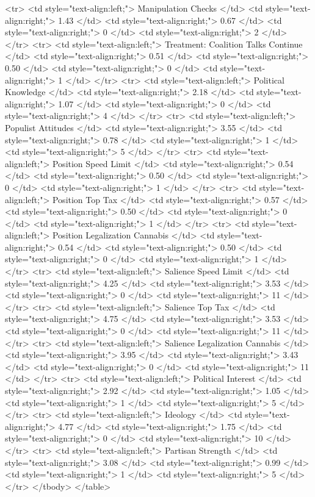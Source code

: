   <tr>
   <td style="text-align:left;"> Manipulation Checks </td>
   <td style="text-align:right;"> 1.43 </td>
   <td style="text-align:right;"> 0.67 </td>
   <td style="text-align:right;"> 0 </td>
   <td style="text-align:right;"> 2 </td>
  </tr>
  <tr>
   <td style="text-align:left;"> Treatment: Coalition Talks Continue </td>
   <td style="text-align:right;"> 0.51 </td>
   <td style="text-align:right;"> 0.50 </td>
   <td style="text-align:right;"> 0 </td>
   <td style="text-align:right;"> 1 </td>
  </tr>
  <tr>
   <td style="text-align:left;"> Political Knowledge </td>
   <td style="text-align:right;"> 2.18 </td>
   <td style="text-align:right;"> 1.07 </td>
   <td style="text-align:right;"> 0 </td>
   <td style="text-align:right;"> 4 </td>
  </tr>
  <tr>
   <td style="text-align:left;"> Populist Attitudes </td>
   <td style="text-align:right;"> 3.55 </td>
   <td style="text-align:right;"> 0.78 </td>
   <td style="text-align:right;"> 1 </td>
   <td style="text-align:right;"> 5 </td>
  </tr>
  <tr>
   <td style="text-align:left;"> Position Speed Limit </td>
   <td style="text-align:right;"> 0.54 </td>
   <td style="text-align:right;"> 0.50 </td>
   <td style="text-align:right;"> 0 </td>
   <td style="text-align:right;"> 1 </td>
  </tr>
  <tr>
   <td style="text-align:left;"> Position Top Tax </td>
   <td style="text-align:right;"> 0.57 </td>
   <td style="text-align:right;"> 0.50 </td>
   <td style="text-align:right;"> 0 </td>
   <td style="text-align:right;"> 1 </td>
  </tr>
  <tr>
   <td style="text-align:left;"> Position Legalization Cannabis </td>
   <td style="text-align:right;"> 0.54 </td>
   <td style="text-align:right;"> 0.50 </td>
   <td style="text-align:right;"> 0 </td>
   <td style="text-align:right;"> 1 </td>
  </tr>
  <tr>
   <td style="text-align:left;"> Salience Speed Limit </td>
   <td style="text-align:right;"> 4.25 </td>
   <td style="text-align:right;"> 3.53 </td>
   <td style="text-align:right;"> 0 </td>
   <td style="text-align:right;"> 11 </td>
  </tr>
  <tr>
   <td style="text-align:left;"> Salience Top Tax </td>
   <td style="text-align:right;"> 4.75 </td>
   <td style="text-align:right;"> 3.53 </td>
   <td style="text-align:right;"> 0 </td>
   <td style="text-align:right;"> 11 </td>
  </tr>
  <tr>
   <td style="text-align:left;"> Salience Legalization Cannabis </td>
   <td style="text-align:right;"> 3.95 </td>
   <td style="text-align:right;"> 3.43 </td>
   <td style="text-align:right;"> 0 </td>
   <td style="text-align:right;"> 11 </td>
  </tr>
  <tr>
   <td style="text-align:left;"> Political Interest </td>
   <td style="text-align:right;"> 2.92 </td>
   <td style="text-align:right;"> 1.05 </td>
   <td style="text-align:right;"> 1 </td>
   <td style="text-align:right;"> 5 </td>
  </tr>
  <tr>
   <td style="text-align:left;"> Ideology </td>
   <td style="text-align:right;"> 4.77 </td>
   <td style="text-align:right;"> 1.75 </td>
   <td style="text-align:right;"> 0 </td>
   <td style="text-align:right;"> 10 </td>
  </tr>
  <tr>
   <td style="text-align:left;"> Partisan Strength </td>
   <td style="text-align:right;"> 3.08 </td>
   <td style="text-align:right;"> 0.99 </td>
   <td style="text-align:right;"> 1 </td>
   <td style="text-align:right;"> 5 </td>
  </tr>
</tbody>
</table>
